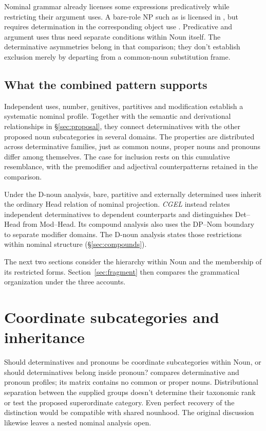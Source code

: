\documentclass[12pt]{article}
\begin{document}
Nominal grammar already licenses some expressions predicatively while restricting their argument uses. A bare-role NP such as  is licensed in , but requires determination in the corresponding object use  \citep[328]{huddleston2002}. Predicative and argument uses thus need separate conditions within Noun itself. The determinative asymmetries belong in that comparison; they don't establish exclusion merely by departing from a common-noun substitution frame.

\subsection{What the combined pattern supports}\label{sec:cumulative}

Independent uses, number, genitives, partitives and modification establish a systematic nominal profile. Together with the semantic and derivational relationships in §\ref{sec:proposal}, they connect determinatives with the other proposed noun subcategories in several domains. The properties are distributed across determinative families, just as common nouns, proper nouns and pronouns differ among themselves. The case for inclusion rests on this cumulative resemblance, with the premodifier and adjectival counterpatterns retained in the comparison.

Under the D-noun analysis, bare, partitive and externally determined uses inherit the ordinary Head relation of nominal projection. \textit{CGEL} instead relates independent determinatives to dependent counterparts and distinguishes Det--Head from Mod--Head. Its compound analysis also uses the DP--Nom boundary to separate modifier domains. The D-noun analysis states those restrictions within nominal structure (§\ref{sec:compounds}).

The next two sections consider the hierarchy within Noun and the membership of its restricted forms. Section~\ref{sec:fragment} then compares the grammatical organization under the three accounts.

\section{Coordinate subcategories and inheritance}\label{sec:inheritance}

Should determinatives and pronouns be coordinate subcategories within Noun, or should determinatives belong inside pronoun? \textcite{reynolds2021} compares determinative and pronoun profiles; its matrix contains no common or proper nouns. Distributional separation between the supplied groups doesn't determine their taxonomic rank or test the proposed superordinate category. Even perfect recovery of the distinction would be compatible with shared nounhood. The original discussion likewise leaves a nested nominal analysis open.
\end{document}

